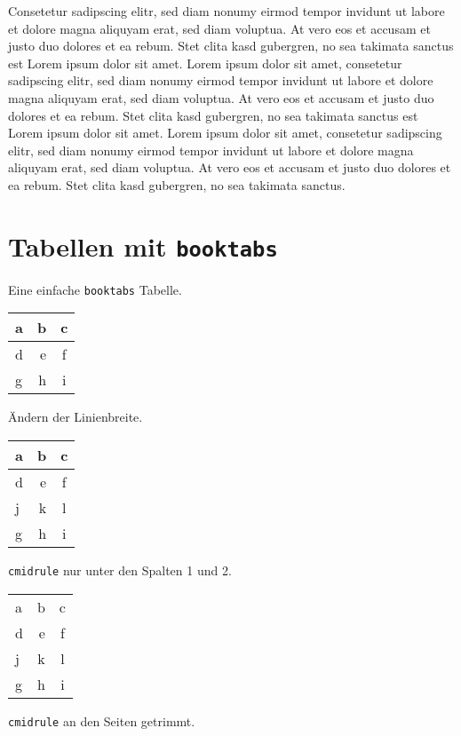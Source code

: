 Consetetur sadipscing elitr, sed diam nonumy eirmod tempor invidunt ut labore et dolore magna aliquyam erat, sed diam voluptua. At vero eos et accusam et justo duo dolores et ea rebum. Stet clita kasd gubergren, no sea takimata sanctus est Lorem ipsum dolor sit amet. Lorem ipsum dolor sit amet, consetetur sadipscing elitr, sed diam nonumy eirmod tempor invidunt ut labore et dolore magna aliquyam erat, sed diam voluptua. At vero eos et accusam et justo duo dolores et ea rebum. Stet clita kasd gubergren, no sea takimata sanctus est Lorem ipsum dolor sit amet. Lorem ipsum dolor sit amet, consetetur sadipscing elitr, sed diam nonumy eirmod tempor invidunt ut labore et dolore magna aliquyam erat, sed diam voluptua. At vero eos et accusam et justo duo dolores et ea rebum. Stet clita kasd gubergren, no sea takimata sanctus.
  

\section{Tabellen mit \texttt{booktabs}} \label{sec:booktabs}

Eine einfache \texttt{booktabs} Tabelle.

\begin{tabular}{lrc} \toprule
a & b & c \\ \midrule
d & e & f \\
g & h & i \\ \bottomrule
\end{tabular}

Ändern der Linienbreite.

\begin{tabular}{lrc} \toprule[2pt]
a & b & c \\ \midrule[1pt]
d & e & f \\
j & k & l \\
g & h & i \\ \bottomrule[2pt]
\end{tabular}

\texttt{cmidrule} nur unter den Spalten 1 und 2.

\begin{tabular}{lrc} \toprule[2pt]
a & b & c \\ \cmidrule[1pt]{1-2}
d & e & f \\
j & k & l \\
g & h & i \\ \bottomrule[2pt]
\end{tabular}

\texttt{cmidrule} an den Seiten getrimmt.


